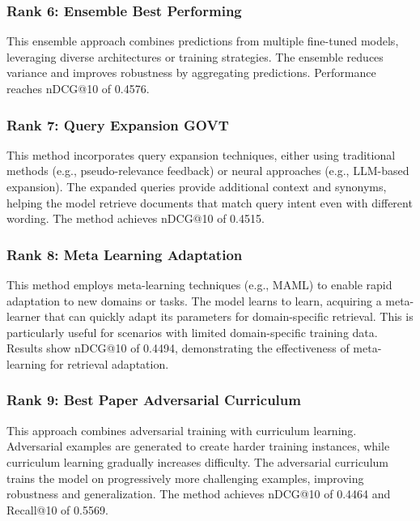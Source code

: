 \documentclass[conference]{IEEEtran}
\begin{document}
\subsubsection{Rank 6: Ensemble Best Performing}

This ensemble approach combines predictions from multiple fine-tuned models, leveraging diverse architectures or training strategies. The ensemble reduces variance and improves robustness by aggregating predictions. Performance reaches nDCG@10 of 0.4576. 

\subsubsection{Rank 7: Query Expansion GOVT}

This method incorporates query expansion techniques, either using traditional methods (e.g., pseudo-relevance feedback) or neural approaches (e.g., LLM-based expansion). The expanded queries provide additional context and synonyms, helping the model retrieve documents that match query intent even with different wording. The method achieves nDCG@10 of 0.4515. 

\subsubsection{Rank 8: Meta Learning Adaptation}

This method employs meta-learning techniques (e.g., MAML) to enable rapid adaptation to new domains or tasks. The model learns to learn, acquiring a meta-learner that can quickly adapt its parameters for domain-specific retrieval. This is particularly useful for scenarios with limited domain-specific training data. Results show nDCG@10 of 0.4494, demonstrating the effectiveness of meta-learning for retrieval adaptation. 

\subsubsection{Rank 9: Best Paper Adversarial Curriculum}

This approach combines adversarial training with curriculum learning. Adversarial examples are generated to create harder training instances, while curriculum learning gradually increases difficulty. The adversarial curriculum trains the model on progressively more challenging examples, improving robustness and generalization. The method achieves nDCG@10 of 0.4464 and Recall@10 of 0.5569. 
\end{document}
